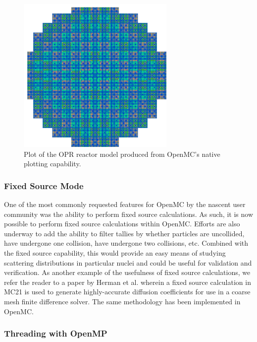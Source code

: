 \documentclass{ansconf}
\begin{document}
\begin{figure}[!htb]
  \centering \includegraphics[width=3in]{opr.png}
  \caption{Plot of the OPR reactor model produced from OpenMC's native plotting
    capability.}
  \label{fig:plotting}
\end{figure}


\subsubsection{Fixed Source Mode}

One of the most commonly requested features for OpenMC by the nascent user
community was the ability to perform fixed source calculations. As such, it is
now possible to perform fixed source calculations within OpenMC. Efforts are
also underway to add the ability to filter tallies by whether particles are
uncollided, have undergone one collision, have undergone two collisions,
etc. Combined with the fixed source capability, this would provide an easy means
of studying scattering distributions in particular nuclei and could be useful
for validation and verification. As another example of the usefulness of fixed
source calculations, we refer the reader to a paper by Herman et
al. \cite{mc-herman-2013} wherein a fixed source calculation in MC21 is used to
generate highly-accurate diffusion coefficients for use in a coarse mesh finite
difference solver. The same methodology has been implemented in OpenMC.

\subsubsection{Threading with OpenMP}
\end{document}
